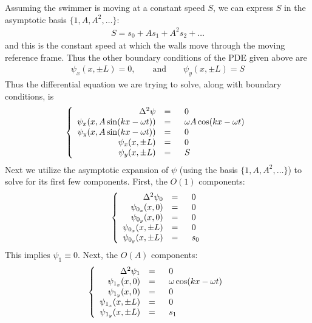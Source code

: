 \documentclass{article} %
\theoremstyle{plain}
\newcommand{\lap}{\Delta}
\numberwithin{equation}{section} %
\numberwithin{figure}{section} %
\numberwithin{table}{section} %
\begin{document}
Assuming the swimmer is moving at a constant speed $S$, we can express $S$ in the asymptotic basis $\{1, A, A^2, \dots\}$:
\begin{align*}
    S = s_0 + As_1 + A^2s_2 + \dots
\end{align*}
and this is the constant speed at which the walls move through the moving reference frame.  Thus the other boundary conditions of the PDE given above are
\begin{align*}
    \psi_x(x, \pm L) = 0, \qquad \text{and} \qquad \psi_y(x, \pm L) = S
\end{align*}
Thus the differential equation we are trying to solve, along with boundary conditions, is
\begin{align*}
    \left\{\begin{array}{rl}
        \lap^2 \psi &=\ \ \ \ 0 \\
        \psi_{x}\qty(x, A\sin(kx - \omega t)) &=\ \ \ \ \omega A\cos(kx - \omega t) \\
        \psi_{y}\qty(x, A\sin(kx - \omega t)) &=\ \ \ \ 0 \\
        \psi_{x}\qty(x, \pm L) &=\ \ \ \ 0 \\
        \psi_{y}\qty(x, \pm L) &=\ \ \ \ S
    \end{array}\right.
\end{align*}
Next we utilize the asymptotic expansion of $\psi$ (using the basis $\{1,A,A^2,\dots\}$) to solve for its first few components.  First, the $O(1)$ components:
\begin{align*}
    \left\{\begin{array}{rl}
        \lap^2 \psi_0 &=\ \ \ \ 0 \\
        \psi_{0_x}\qty(x, 0) &=\ \ \ \ 0 \\
        \psi_{0_y}\qty(x, 0) &=\ \ \ \ 0 \\
        \psi_{0_x}\qty(x, \pm L) &=\ \ \ \ 0 \\
        \psi_{0_y}\qty(x, \pm L) &=\ \ \ \ s_0
    \end{array}\right.
\end{align*}
This implies $\psi_1 \equiv 0$.  Next, the $O(A)$ components:
\begin{align*}
    \left\{\begin{array}{rl}
        \lap^2 \psi_1 &=\ \ \ \ 0 \\
        \psi_{1_x}\qty(x, 0) &=\ \ \ \ \omega \cos(kx - \omega t) \\
        \psi_{1_y}\qty(x, 0) &=\ \ \ \ 0 \\
        \psi_{1_x}\qty(x, \pm L) &=\ \ \ \ 0 \\
        \psi_{1_y}\qty(x, \pm L) &=\ \ \ \ s_1
    \end{array}\right.
\end{align*}
\end{document}
